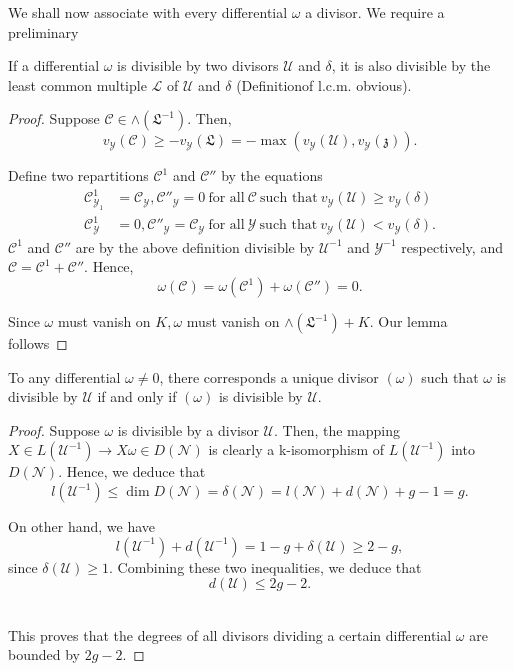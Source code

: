 We shall now associate with every differential $\omega$ a divisor. We
require a preliminary 
\begin{lemma*}
  If a differential $\omega$ is divisible by two divisors
  $\mathscr{U}$ and $\delta$, it is also divisible by the least common
  multiple $\mathscr{L}$ of $\mathscr{U}$ and $\delta$ (Definition\pageoriginale of
  l.c.m. obvious). 
\end{lemma*}

\begin{proof}
  Suppose $\mathscr{C} \in \wedge (\mathfrak{L}^{-1})$. Then,
  $$
  v_\mathscr{Y} (\mathscr{C}) \ge -v_{\mathscr{Y}} (\mathfrak{L}) =
  -\max (v_\mathscr{Y}(\mathscr{U}), v_\mathscr{Y} (\mathfrak{z})) . 
  $$

  Define two repartitions $\mathscr{C}^1$ and $\mathscr{C}''$ by the equations
  \begin{align*}
    \mathscr{C}^1_{\mathscr{Y}_1}  & = \mathscr{C}_\mathscr{Y} ,
    \mathscr{C}''_\mathscr{Y} = 0 ~ \text{for all} ~ \mathscr{C} ~
    \text{such that}~ v_\mathscr{Y}(\mathscr{U}) \ge v_\mathscr{Y}
    (\delta)\\ 
    \mathscr{C}^1_\mathscr{Y} & = 0, \mathscr{C}''_\mathscr{Y} =
    \mathscr{C}_\mathscr{Y}~\text{for all}~ \mathscr{Y} ~\text{such
      that}~ v_\mathscr{Y}(\mathscr{U}) < v_\mathscr{Y} (\delta). 
  \end{align*}
  $\mathscr{C}^1$ and $\mathscr{C}''$ are by the above definition
  divisible by $\mathscr{U}^{-1}$ and $\mathscr{Y}^{-1}$ respectively,
  and $\mathscr{C} = \mathscr{C}^1 + \mathscr{C}''$. Hence, 
  $$
  \omega (\mathscr{C}) = \omega(\mathscr{C}^1) + \omega(\mathscr{C}'') = 0 .
  $$

  Since $\omega$ must vanish on $K, \omega$ must vanish on
  $\wedge(\mathfrak{L}^{-1}) + K$. Our lemma follows 
\end{proof}

\begin{theorem*}
  To any differential $\omega \neq 0$, there corresponds a unique
  divisor $(\omega)$ such that $\omega$ is divisible by $\mathscr{U}$
  if and only if $(\omega)$ is divisible by $\mathscr{U}$. 
\end{theorem*}

\begin{proof}
  Suppose $\omega$ is divisible by a divisor $\mathscr{U}$. Then, the
  mapping $X \in L(\mathscr{U}^{-1}) \to X\omega \in D (\mathscr{N})$ is
  clearly a k-isomorphism of $L(\mathscr{U}^{-1})$ into
  $D(\mathscr{N})$. Hence, we deduce that 
  $$
  l(\mathscr{U}^{-1}) \le \dim D (\mathscr{N}) = \delta (\mathscr{N})
  = l(\mathscr{N}) + d(\mathscr{N}) + g -1 = g . 
  $$

  On other hand, we have
  $$
  l(\mathscr{U}^{-1}) + d(\mathscr{U}^{-1}) = 1 - g + \delta
  (\mathscr{U}) \ge 2 - g, 
  $$
  since $\delta(\mathscr{U}) \ge 1$. Combining these two inequalities,
  we deduce that 
  $$
  d(\mathscr{U}) \le 2 g - 2 .
  $$\pageoriginale\

  This proves that the degrees of all divisors dividing a certain
  differential $\omega$ are bounded by $2g - 2$. 
\end{proof}

